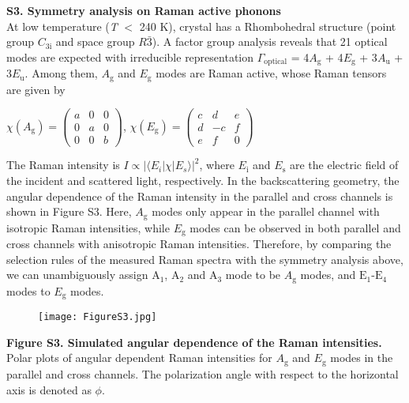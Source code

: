 \documentclass[prl, preprint, superscriptaddress]{revtex4-1}
\begin{document}
\newpage
\noindent\textbf{S3. Symmetry analysis on Raman active phonons}\\

\noindent At low temperature (\textit{T} $<$ 240 K),  crystal has a Rhombohedral structure (point group $C_\mathrm{3i}$ and space group $R\bar{3}$). A factor group analysis reveals that 21 optical modes are expected with irreducible representation $\varGamma_\mathrm{optical}$  = 4$A_\mathrm{g}$ + 4$E_\mathrm{g}$ + 3$A_\mathrm{u}$ + 3$E_\mathrm{u}$. Among them, $A_\mathrm{g}$ and $E_\mathrm{g}$ modes are Raman active, whose Raman tensors are given by
\begin{center}
$\chi(A_\mathrm{g})=\begin{pmatrix} a & 0 & 0 \\ 0 & a & 0 \\  0 & 0 & b \end{pmatrix}$, \hspace{1in} $\chi(E_\mathrm{g})=\begin{pmatrix} c & d & e \\ d & -c & f \\  e & f & 0 \end{pmatrix}$
\end{center}

\noindent The Raman intensity is $I \propto |\langle E_{i} | \chi | E_{s}\rangle|^2$, where $E_\mathrm{i}$ and $E_\mathrm{s}$ are the electric field of the incident and scattered light, respectively. In the backscattering geometry, the angular dependence of the Raman intensity in the parallel and cross channels is shown in Figure S3. Here, $A_\mathrm{g}$ modes only appear in the parallel channel with isotropic Raman intensities, while $E_\mathrm{g}$ modes can be observed in both parallel and cross channels with anisotropic Raman intensities. Therefore, by comparing the selection rules of the measured Raman spectra with the symmetry analysis above, we can unambiguously assign $\mathrm{A}_\mathrm{1}$, $\mathrm{A}_\mathrm{2}$ and $\mathrm{A}_\mathrm{3}$ mode to be $A_\mathrm{g}$ modes, and $\mathrm{E}_\mathrm{1}$-$\mathrm{E}_\mathrm{4}$ modes to $E_\mathrm{g}$ modes.

\begin{figure}[!h]
\texttt{[image: FigureS3.jpg]}
\end{figure}
\vspace{-5pt}
\begin{footnotesize}
\noindent\textbf{Figure S3. Simulated angular dependence of the Raman intensities.} Polar plots of angular dependent Raman intensities for $A_\mathrm{g}$ and $E_\mathrm{g}$ modes in the parallel and cross channels. The polarization angle with respect to the horizontal axis is denoted as $\phi$. \\
\end{footnotesize}
\end{document}
